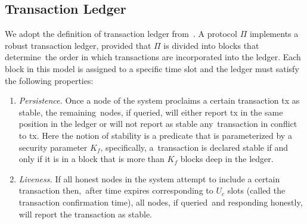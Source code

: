 \subsection{Transaction Ledger}\label{subsec:transaction-ledger.}
We adopt the definition of transaction ledger from~\cite{cryptoeprint:2016/889}.
A protocol $\Pi$ implements a robust transaction ledger, provided that $\Pi$ is divided into blocks that determine\
the order in which transactions are incorporated into the ledger.
Each block in this model is assigned to a specific time slot and the ledger must satisfy the following properties:
\begin{enumerate}
    \item \emph{Persistence.} Once a node of the system proclaims a certain transaction tx as stable, the remaining\
    nodes, if queried, will either report tx in the same position in the ledger or will not report as stable any\
    transaction in conflict to tx.
    Here the notion of stability is a predicate that is parameterized by a security parameter $K_f$, specifically, a\
    transaction is declared stable if and only if it is in a block that is more than $K_f$ blocks deep in the ledger.
    \item \emph{Liveness.} If all honest nodes in the system attempt to include a certain transaction then,\
    after time expires corresponding to $U_c$ slots (called the transaction confirmation time), all nodes, if queried\
    and responding honestly, will report the transaction as stable.
\end{enumerate}
